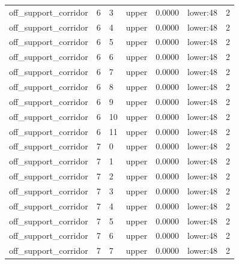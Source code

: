\documentclass{article}
\begin{document}
\begin{table}[tbp]
{\begin{tabular}{lllllll}
off\_support\_corridor & 6 & 3 & upper & 0.0000 & lower:48 & 2 \\
off\_support\_corridor & 6 & 4 & upper & 0.0000 & lower:48 & 2 \\
off\_support\_corridor & 6 & 5 & upper & 0.0000 & lower:48 & 2 \\
off\_support\_corridor & 6 & 6 & upper & 0.0000 & lower:48 & 2 \\
off\_support\_corridor & 6 & 7 & upper & 0.0000 & lower:48 & 2 \\
off\_support\_corridor & 6 & 8 & upper & 0.0000 & lower:48 & 2 \\
off\_support\_corridor & 6 & 9 & upper & 0.0000 & lower:48 & 2 \\
off\_support\_corridor & 6 & 10 & upper & 0.0000 & lower:48 & 2 \\
off\_support\_corridor & 6 & 11 & upper & 0.0000 & lower:48 & 2 \\
off\_support\_corridor & 7 & 0 & upper & 0.0000 & lower:48 & 2 \\
off\_support\_corridor & 7 & 1 & upper & 0.0000 & lower:48 & 2 \\
off\_support\_corridor & 7 & 2 & upper & 0.0000 & lower:48 & 2 \\
off\_support\_corridor & 7 & 3 & upper & 0.0000 & lower:48 & 2 \\
off\_support\_corridor & 7 & 4 & upper & 0.0000 & lower:48 & 2 \\
off\_support\_corridor & 7 & 5 & upper & 0.0000 & lower:48 & 2 \\
off\_support\_corridor & 7 & 6 & upper & 0.0000 & lower:48 & 2 \\
off\_support\_corridor & 7 & 7 & upper & 0.0000 & lower:48 & 2 \\
\bottomrule
\end{tabular}
}
\end{table}

\clearpage
\end{document}
